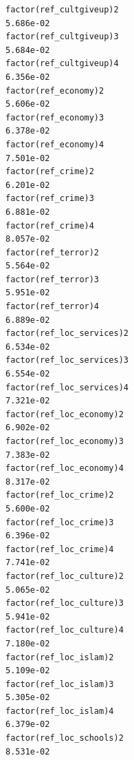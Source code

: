 \documentclass[
]{article}
\begin{document}
\begin{table}
\begin{minipage}[t]{\linewidth}
{\begin{verbatim}
factor(ref_cultgiveup)2                                                            5.686e-02
factor(ref_cultgiveup)3                                                            5.684e-02
factor(ref_cultgiveup)4                                                            6.356e-02
factor(ref_economy)2                                                               5.606e-02
factor(ref_economy)3                                                               6.378e-02
factor(ref_economy)4                                                               7.501e-02
factor(ref_crime)2                                                                 6.201e-02
factor(ref_crime)3                                                                 6.881e-02
factor(ref_crime)4                                                                 8.057e-02
factor(ref_terror)2                                                                5.564e-02
factor(ref_terror)3                                                                5.951e-02
factor(ref_terror)4                                                                6.889e-02
factor(ref_loc_services)2                                                          6.534e-02
factor(ref_loc_services)3                                                          6.554e-02
factor(ref_loc_services)4                                                          7.321e-02
factor(ref_loc_economy)2                                                           6.902e-02
factor(ref_loc_economy)3                                                           7.383e-02
factor(ref_loc_economy)4                                                           8.317e-02
factor(ref_loc_crime)2                                                             5.600e-02
factor(ref_loc_crime)3                                                             6.396e-02
factor(ref_loc_crime)4                                                             7.741e-02
factor(ref_loc_culture)2                                                           5.065e-02
factor(ref_loc_culture)3                                                           5.941e-02
factor(ref_loc_culture)4                                                           7.180e-02
factor(ref_loc_islam)2                                                             5.109e-02
factor(ref_loc_islam)3                                                             5.305e-02
factor(ref_loc_islam)4                                                             6.379e-02
factor(ref_loc_schools)2                                                           8.531e-02

\end{verbatim}}
\end{minipage}
\end{table}
\end{document}
